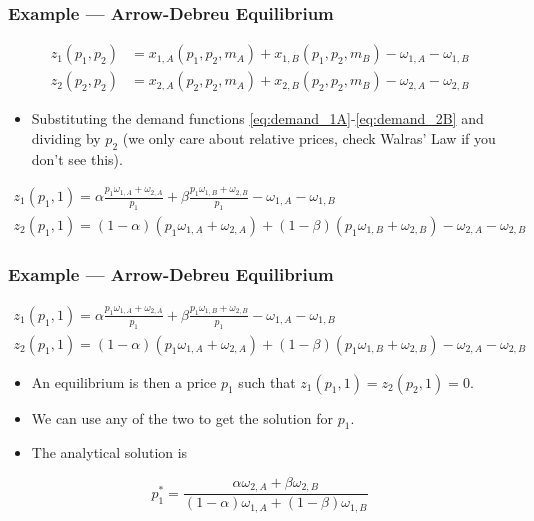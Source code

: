 \documentclass[11pt,xcolor={svgnames},aspectratio=169,usepdftitle=false,notheorems]{beamer}
\begin{document}
\begin{frame}[c]
  \frametitle{Example --- Arrow-Debreu Equilibrium}
    \begin{align*}
      z_1(p_1, p_2) & = x_{1,A}\left( p_1, p_2, m_A \right) + x_{1,B}\left( p_1, p_2, m_B \right) - \omega_{1,A} - \omega_{1,B} \\
      z_2(p_2, p_2) & = x_{2,A}\left( p_2, p_2, m_A \right) + x_{2,B}\left( p_2, p_2, m_B \right) - \omega_{2,A} - \omega_{2,B}
    \end{align*}
\begin{itemize}
  \item Substituting the demand functions \eqref{eq:demand_1A}-\eqref{eq:demand_2B} and dividing by $p_2$ (we only care about relative prices, check Walras' Law if you don't see this).
\end{itemize}
\begin{gather*}
  z_1(p_1, 1) = \alpha \frac{p_1\omega_{1,A} + \omega_{2,A}}{p_1} + \beta \frac{p_1\omega_{1,B} + \omega_{2,B}}{p_1} - \omega_{1,A} - \omega_{1,B} \\
  z_2(p_1, 1) = (1 - \alpha) \left(p_1\omega_{1,A} + \omega_{2,A}\right) + (1 - \beta) \left(p_1\omega_{1,B} + \omega_{2,B}\right) - \omega_{2,A} - \omega_{2,B}
\end{gather*}
\end{frame}

\begin{frame}[c]
  \frametitle{Example --- Arrow-Debreu Equilibrium}
\begin{gather}
  z_1(p_1, 1) = \alpha \frac{p_1\omega_{1,A} + \omega_{2,A}}{p_1} + \beta \frac{p_1\omega_{1,B} + \omega_{2,B}}{p_1} - \omega_{1,A} - \omega_{1,B} \\
  z_2(p_1, 1) = (1 - \alpha) \left(p_1\omega_{1,A} + \omega_{2,A}\right) + (1 - \beta) \left(p_1\omega_{1,B} + \omega_{2,B}\right) - \omega_{2,A} - \omega_{2,B}
\end{gather}
\begin{itemize}
  \item An equilibrium is then a price $p_1$ such that $z_1(p_1,1) = z_2(p_2,1) = 0$. 
  \item We can use any of the two to get the solution for $p_1$. 
  \item The analytical solution is 
\end{itemize}
\[
  p_1^* = \frac{\alpha\omega_{2,A} + \beta\omega_{2,B}}{(1 - \alpha)\omega_{1,A} + (1 - \beta)\omega_{1,B}} 
\]
\end{frame}
\end{document}
